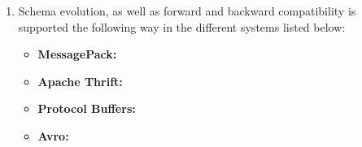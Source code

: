 \begin{enumerate}
\begin{enumerate}
        \end{enumerate}
    \item
        Schema evolution, as well as forward and backward compatibility is
        supported the following way in the different systems listed below:
        \begin{itemize}
            \item 
                \textbf{MessagePack:}
            \item 
                \textbf{Apache Thrift:}
            \item 
                \textbf{Protocol Buffers:}
            \item 
                \textbf{Avro:}
        \end{itemize}
  \end{enumerate}
